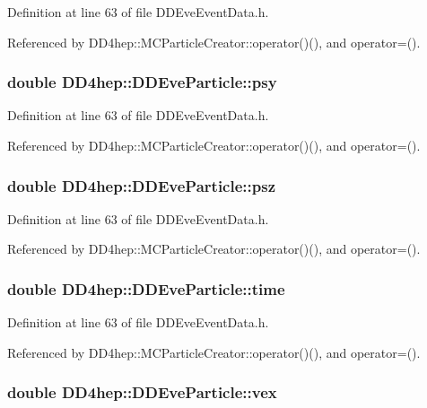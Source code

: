 Definition at line 63 of file DDEveEventData.h.

Referenced by DD4hep::MCParticleCreator::operator()(), and operator=().\hypertarget{class_d_d4hep_1_1_d_d_eve_particle_a5e678bef386cffdab92eaebca644cdd1}{
\subsubsection[{psy}]{\setlength{\rightskip}{0pt plus 5cm}double {\bf DD4hep::DDEveParticle::psy}}}
\label{class_d_d4hep_1_1_d_d_eve_particle_a5e678bef386cffdab92eaebca644cdd1}


Definition at line 63 of file DDEveEventData.h.

Referenced by DD4hep::MCParticleCreator::operator()(), and operator=().\hypertarget{class_d_d4hep_1_1_d_d_eve_particle_ac1ff170f07e4abcecc63bf1c31294de4}{
\subsubsection[{psz}]{\setlength{\rightskip}{0pt plus 5cm}double {\bf DD4hep::DDEveParticle::psz}}}
\label{class_d_d4hep_1_1_d_d_eve_particle_ac1ff170f07e4abcecc63bf1c31294de4}


Definition at line 63 of file DDEveEventData.h.

Referenced by DD4hep::MCParticleCreator::operator()(), and operator=().\hypertarget{class_d_d4hep_1_1_d_d_eve_particle_ad15d69211063590b587d7ba6ff0d8726}{
\subsubsection[{time}]{\setlength{\rightskip}{0pt plus 5cm}double {\bf DD4hep::DDEveParticle::time}}}
\label{class_d_d4hep_1_1_d_d_eve_particle_ad15d69211063590b587d7ba6ff0d8726}


Definition at line 63 of file DDEveEventData.h.

Referenced by DD4hep::MCParticleCreator::operator()(), and operator=().\hypertarget{class_d_d4hep_1_1_d_d_eve_particle_ae4631ff73de167405ea1c680f5217172}{
\subsubsection[{vex}]{\setlength{\rightskip}{0pt plus 5cm}double {\bf DD4hep::DDEveParticle::vex}}}
\label{class_d_d4hep_1_1_d_d_eve_particle_ae4631ff73de167405ea1c680f5217172}


